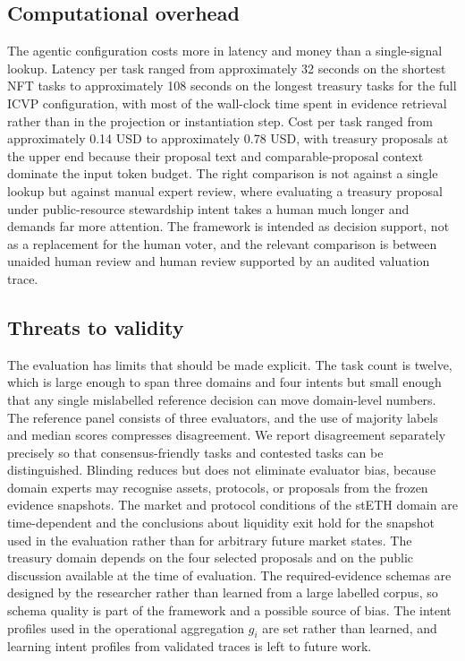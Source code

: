 \subsection{Computational overhead}

The agentic configuration costs more in latency and money than a single-signal lookup. Latency per task ranged from approximately 32 seconds on the shortest NFT tasks to approximately 108 seconds on the longest treasury tasks for the full ICVP configuration, with most of the wall-clock time spent in evidence retrieval rather than in the projection or instantiation step. Cost per task ranged from approximately 0.14 USD to approximately 0.78 USD, with treasury proposals at the upper end because their proposal text and comparable-proposal context dominate the input token budget. The right comparison is not against a single lookup but against manual expert review, where evaluating a treasury proposal under public-resource stewardship intent takes a human much longer and demands far more attention. The framework is intended as decision support, not as a replacement for the human voter, and the relevant comparison is between unaided human review and human review supported by an audited valuation trace.

\subsection{Threats to validity}

The evaluation has limits that should be made explicit. The task count is twelve, which is large enough to span three domains and four intents but small enough that any single mislabelled reference decision can move domain-level numbers. The reference panel consists of three evaluators, and the use of majority labels and median scores compresses disagreement. We report disagreement separately precisely so that consensus-friendly tasks and contested tasks can be distinguished. Blinding reduces but does not eliminate evaluator bias, because domain experts may recognise assets, protocols, or proposals from the frozen evidence snapshots. The market and protocol conditions of the stETH domain are time-dependent and the conclusions about liquidity exit hold for the snapshot used in the evaluation rather than for arbitrary future market states. The treasury domain depends on the four selected proposals and on the public discussion available at the time of evaluation. The required-evidence schemas are designed by the researcher rather than learned from a large labelled corpus, so schema quality is part of the framework and a possible source of bias. The intent profiles used in the operational aggregation $g_i$ are set rather than learned, and learning intent profiles from validated traces is left to future work.

